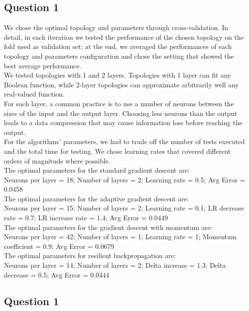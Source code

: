 \documentclass{article}
\begin{document}
\subsection{Question 1}
We chose the optimal topology and parameters through cross-validation. In detail, in each iteration we tested the performance of the chosen topology on the fold used as validation set; at the end, we averaged the performances of each topology and parameters configuration and chose the setting that showed the best average performance.\\
We tested topologies with 1 and 2 layers. Topologies with 1 layer can fit any Boolean function, while 2-layer topologies can approximate arbitrarily well any real-valued function.\\
For each layer, a common practice is to use a number of neurons between the sizes of the input and the output layer. Choosing less neurons than the output leads to a data compression that may cause information loss before reaching the output.\\
For the algorithms' parameters, we had to trade off the number of tests executed and the total time for testing. We chose learning rates that covered different orders of magnitude where possible.\\
The optimal parameters for the standard gradient descent are:\\
Neurons per layer = 18; Number of layers = 2; Learning rate = 0.5; Avg Error = 0.0458\\
The optimal parameters for the adaptive gradient descent are:\\
Neurons per layer = 15; Number of layers = 2; Learning rate = 0.1; LR decrease rate = 0.7; LR increase rate = 1.4; Avg Error = 0.0449\\
The optimal parameters for the gradient descent with momentum are:\\
Neurons per layer = 42; Number of layers = 1; Learning rate = 1; Momentum coefficient = 0.9; Avg Error = 0.0679\\
The optimal parameters for resilient backpropagation are:\\
Neurons per layer = 14; Number of layers = 2; Delta increase = 1.3; Delta decrease = 0.5; Avg Error = 0.0444\\


\subsection{Question 1}
\end{document}
